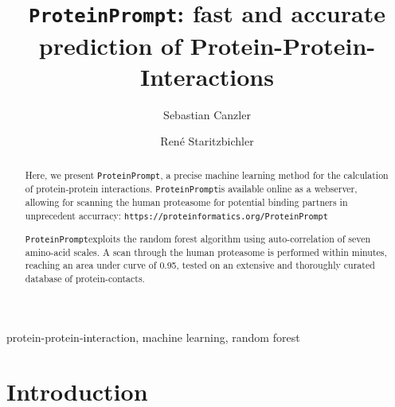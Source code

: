 \documentclass[preprint,3p,times,twocolumn]{elsarticle}
\newcommand{\url}[1]{\texttt{https://\small #1}}
\newcommand{\tool}{\texttt{ProteinPrompt}\hspace{2pt}}
\newcommand{\website}{\url{proteinformatics.org/\tool}}
\begin{document}
\begin{frontmatter}
   
\title{\tool: fast and accurate prediction of Protein-Protein-Interactions}

\author[LEI,IMT]{Sebastian Canzler}
\author[PHY,IMT]{Ren\'{e} Staritzbichler}


\address[LEI]{Bioinformatics Group, Department of Computer Science,
  University of Leipzig,
  H{\"a}rtelstra{\ss}e 16-18, 04107 Leipzig, Germany
}
\address[PHY]{ProteinFormatics Group, Institute of Medical Physics and Biophysics, University of Leipzig,
  H{\"a}rtelstra{\ss}e 16-18, 04107 Leipzig, Germany.}

\address[IMT]{Immuthera GmbH, L{\"o}{\ss}niger Stra{\ss}e 16, 04275 Leipzig, Germany.}



 

\begin{abstract}

  Here, we present \tool, a precise machine learning method for the calculation of protein-protein interactions.
  \tool  is available online as a webserver, allowing for scanning the human proteasome for potential binding partners in unprecedent accurracy:
  \website

  \tool exploits the random forest algorithm using auto-correlation of seven amino-acid scales.
  A scan through the human proteasome is performed within minutes, reaching an area under curve of 0.95, tested on an extensive and thoroughly curated database of protein-contacts.
  
\end{abstract}

\begin{keyword}
  protein-protein-interaction, machine learning, random forest
\end{keyword}

\end{frontmatter}


\section{Introduction}
\end{document}
